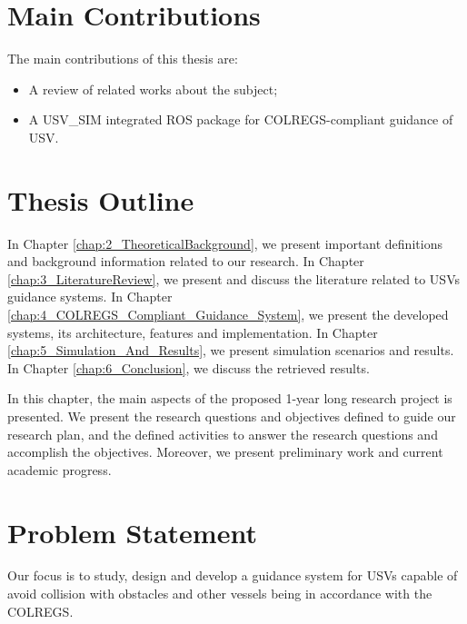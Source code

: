     \section{Main Contributions}
    
    The main contributions of this thesis are:
    \begin{itemize}
        \item A review of related works about the subject;
        \item A USV\_SIM integrated ROS package for COLREGS-compliant guidance of \ac{USV}.
    \end{itemize}

    \section{Thesis Outline}
    
    In Chapter \ref{chap:2_TheoreticalBackground}, we present important definitions and background information related to our research. In Chapter \ref{chap:3_LiteratureReview}, we present and discuss the literature related to \acp{USV} guidance systems. 
    In Chapter \ref{chap:4_COLREGS_Compliant_Guidance_System}, we present the developed systems, its architecture, features and implementation. In Chapter \ref{chap:5_Simulation_And_Results}, we present simulation scenarios and results. In Chapter \ref{chap:6_Conclusion}, we discuss the retrieved results.
    
    
    In this chapter, the main aspects of the proposed 1-year long research project is presented. We present the research questions and objectives defined to guide our research plan, and the defined activities to answer the research questions and accomplish the objectives. Moreover, we present preliminary work and current academic progress.
    
    \section{Problem Statement}
    \label{sec:problem_statement}

    Our focus is to study, design and develop a guidance system for \acfp{USV} capable of avoid collision with obstacles and other vessels being in accordance with the \ac{COLREGS}.

